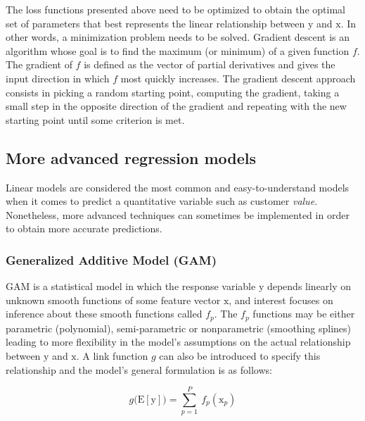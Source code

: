 \documentclass[
]{book}
\begin{document}
The loss functions presented above need to be optimized to obtain the optimal set of parameters that best represents the linear relationship between \(\mathrm{y}\) and \(\pmb{\mathrm{x}}\). In other words, a minimization problem needs to be solved. Gradient descent is an algorithm whose goal is to find the maximum (or minimum) of a given function \(f\). The gradient of \(f\) is defined as the vector of partial derivatives and gives the input direction in which \(f\) most quickly increases. The gradient descent approach consists in picking a random starting point, computing the gradient, taking a small step in the opposite direction of the gradient and repeating with the new starting point until some criterion is met.

\hypertarget{more-advanced-regression-models}{%
\subsection{More advanced regression models}\label{more-advanced-regression-models}}

Linear models are considered the most common and easy-to-understand models when it comes to predict a quantitative variable such as customer \emph{value.} Nonetheless, more advanced techniques can sometimes be implemented in order to obtain more accurate predictions.

\hypertarget{generalized-additive-model-gam}{%
\subsubsection*{Generalized Additive Model (GAM)}\label{generalized-additive-model-gam}}

GAM is a statistical model in which the response variable \(\mathrm{y}\) depends linearly on unknown smooth functions of some feature vector \(\pmb{\mathrm{x}}\), and interest focuses on inference about these smooth functions called \(f_p\). The \(f_p\) functions may be either parametric (polynomial), semi-parametric or nonparametric (smoothing splines) leading to more flexibility in the model's assumptions on the actual relationship between \(\mathrm{y}\) and \(\pmb{\mathrm{x}}\). A link function \(g\) can also be introduced to specify this relationship and the model's general formulation is as follows:

\begin{equation}
  g\big(\mathrm{E} [\mathrm{y}] \big) = \sum_{p=1}^P \ f_p(\mathrm{x}_p)
  \label{eq:gam}
\end{equation}
\end{document}
